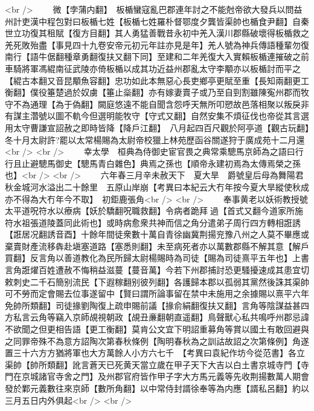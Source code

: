 <br />
　　微【孛蒲内翻】　板楯蠻寇亂巴郡連年討之不能尅帝欲大發兵以問益州計吏漢中程包對曰板楯七姓【板楯七姓羅朴督鄂度夕龔皆渠帥也楯食尹翻】自秦世立功復其租賦【復方目翻】其人勇猛善戰昔永初中羌入漢川郡縣破壞得板楯救之羌死敗殆盡【事見四十九卷安帝元初元年註亦見是年】羌人號為神兵傳語種輩勿復南行【語牛倨翻種章勇翻復扶又翻下同】至建和二年羌復大入實賴板楯連摧破之前車騎將軍馮緄南征武陵亦倚板楯以成其功近益州郡亂太守李顒亦以板楯討而平之【緄古本翻又音昆顒魚容翻】忠功如此本無惡心長吏鄉亭更賦至重【長知兩翻更工衡翻】僕役箠楚過於奴虜【箠止橤翻】亦有嫁妻賣子或乃至自剄割雖陳寃州郡而牧守不為通理【為于偽翻】闕庭悠遠不能自聞含怨呼天無所叩愬故邑落相聚以叛戾非有謀主濳號以圖不軌今但選明能牧守【守式又翻】自然安集不煩征伐也帝從其言選用太守曹謙宣詔赦之即時皆降【降戶江翻】　八月起四百尺觀於阿亭道【觀古玩翻】　冬十月太尉許?罷以太常楊賜為太尉帝校獵上林苑歷函谷關遂狩于廣成苑十二月還<br />
<br />
　　幸太學　桓典為侍御史宦官畏之典常乘驄馬京師為之語曰行行且止避驄馬御史【驄馬青白雜色】典焉之孫也【順帝永建初焉為太傳焉榮之孫也】<br />
<br />
　　六年春三月辛未赦天下　夏大旱　爵號皇后母為舞陽君　秋金城河水溢出二十餘里　五原山岸崩【考異曰本紀云大冇年按今夏大旱縱使秋成亦不得為大冇年今不取】　初鉅鹿張角<br />
<br />
　　奉事黄老以妖術教授號太平道呪符水以療病【妖於驕翻呪職救翻】令病者跪拜過【首式又翻今道家所施符水祖張道陵蓋同此術也】或時病愈衆共神而信之角分遣弟子周行四方轉相誑誘【誑居况翻誘音酉】十餘年間徒衆數十萬自青徐幽冀荆揚兖豫八州之人莫不畢應或棄賣財產流移犇赴塡塞道路【塞悉則翻】未至病死者亦以萬數郡縣不解其意【解戶買翻】反言角以善道教化為民所歸太尉楊賜時為司徒【賜為司徒熹平五年也】上書言角誑燿百姓遭赦不悔稍益滋蔓【蔓音萬】今若下州郡捕討恐更騷擾速成其患宜切敕刺史二千石簡别流民【下遐稼翻别彼列翻】各護歸本郡以孤弱其黨然後誅其渠帥可不勞而定會賜去位事遂留中【賢曰謂所論事留在禁中未施用之余據賜以熹平六年免帥所類翻】司徒掾劉陶復上疏申賜前議【掾俞絹翻復扶又翻】言角等陰謀益甚四方私言云角等竊入京師覘視朝政【覘丑亷翻朝直遥翻】鳥聲獸心私共鳴呼州郡忌諱不欲聞之但更相告語【更工衡翻】莫肯公文宜下明詔重募角等賞以國土有敢回避與之同罪帝殊不為意方詔陶次第春秋條例【陶明春秋為之訓詁故詔之次第條例】角遂置三十六方方猶將軍也大方萬餘人小方六七千　【考異曰袁紀作坊今從范書】各立渠帥【帥所類翻】訛言蒼天已死黄天當立歲在甲子天下大吉以白土書京城寺門【寺門在京城諸官寺舍之門】及州郡官府皆作甲子字大方馬元義等先收荆揚數萬人期會發於鄴元義數往來京師【數所角翻】以中常侍封諝徐奉等為内應【諝私呂翻】約以三月五日内外俱起<br />
<br />
